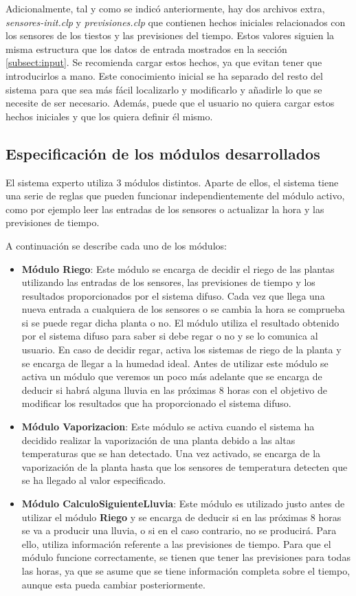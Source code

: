 \documentclass[11pt,a4paper]{article}
\begin{document}
Adicionalmente, tal y como se indicó anteriormente, hay dos archivos extra, \textit{sensores-init.clp} y \textit{previsiones.clp}
que contienen hechos iniciales relacionados con los sensores de los tiestos y las previsiones del tiempo. Estos valores siguien
la misma estructura que los datos de entrada mostrados en la sección \ref{subsect:input}. Se recomienda cargar estos hechos, ya
que evitan tener que introducirlos a mano. Este conocimiento inicial se ha separado del resto del sistema para que sea más fácil
localizarlo y modificarlo y añadirle lo que se necesite de ser necesario. Además, puede que el usuario no quiera cargar estos
hechos iniciales y que los quiera definir él mismo.

\subsection{Especificación de los módulos desarrollados}


El sistema experto utiliza 3 módulos distintos. Aparte de ellos, el sistema tiene una serie de reglas que pueden funcionar
independientemente del módulo activo, como por ejemplo leer las entradas de los sensores o actualizar la hora y las previsiones
de tiempo.

A continuación se describe cada uno de los módulos:

\begin{itemize}
	\item \textbf{Módulo Riego}: Este módulo se encarga de decidir el riego de las plantas utilizando las entradas de los sensores,
	las previsiones de tiempo y los resultados proporcionados por el sistema difuso. Cada vez que llega una nueva entrada a
	cualquiera de los sensores o se cambia la hora se comprueba si se puede regar dicha planta o no. El módulo utiliza el resultado
	obtenido por el sistema difuso para saber si debe regar o no y se lo comunica al usuario. En caso de decidir regar, activa
	los sistemas de riego de la planta y se encarga de llegar a la humedad ideal. Antes de utilizar este módulo se activa un módulo
	que veremos un poco más adelante que se encarga de deducir si habrá alguna lluvia en las próximas 8 horas con el objetivo de
	modificar los resultados que ha proporcionado el sistema difuso.
	\item \textbf{Módulo Vaporizacion}: Este módulo se activa cuando el sistema ha decidido realizar la vaporización de una planta
	debido a las altas temperaturas que se han detectado. Una vez activado, se encarga de la vaporización de la planta hasta que
	los sensores de temperatura detecten que se ha llegado al valor especificado.
	\item \textbf{Módulo CalculoSiguienteLluvia}: Este módulo es utilizado justo antes de utilizar el módulo \textbf{Riego} y se
	encarga de deducir si en las próximas 8 horas se va a producir una lluvia, o si en el caso contrario, no se producirá. Para
	ello, utiliza información referente a las previsiones de tiempo. Para que el módulo funcione correctamente, se tienen que
	tener las previsiones para todas las horas, ya que se asume que se tiene información completa sobre el tiempo, aunque esta pueda
	cambiar posteriormente.
\end{itemize}
\end{document}
